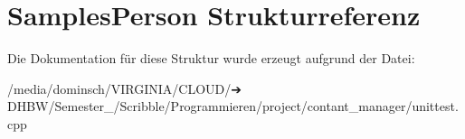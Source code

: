 \hypertarget{structSamplesPerson}{}\section{Samples\+Person Strukturreferenz}
\label{structSamplesPerson}


Die Dokumentation für diese Struktur wurde erzeugt aufgrund der Datei\+:\begin{DoxyCompactItemize}
\item 
/media/dominsch/\+V\+I\+R\+G\+I\+N\+I\+A/\+C\+L\+O\+U\+D/➔ D\+H\+B\+W/\+Semester\+\_/\+Scribble/\+Programmieren/project/contant\+\_\+manager/unittest.\+cpp\end{DoxyCompactItemize}
